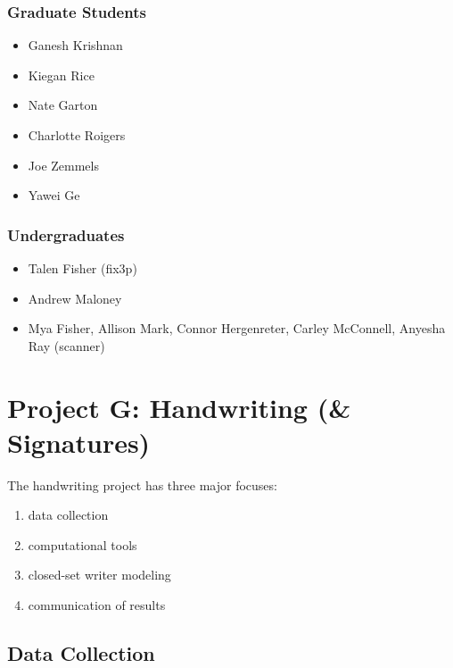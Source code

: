 \documentclass[]{book}
\providecommand{\tightlist}{%
  \setlength{\itemsep}{0pt}\setlength{\parskip}{0pt}}
\begin{document}
\hypertarget{graduate-students}{%
\subsection{Graduate Students}\label{graduate-students}}

\begin{itemize}
\tightlist
\item
  Ganesh Krishnan
\item
  Kiegan Rice
\item
  Nate Garton
\item
  Charlotte Roigers
\item
  Joe Zemmels
\item
  Yawei Ge
\end{itemize}

\hypertarget{undergraduates}{%
\subsection{Undergraduates}\label{undergraduates}}

\begin{itemize}
\tightlist
\item
  Talen Fisher (fix3p)
\item
  Andrew Maloney
\item
  Mya Fisher, Allison Mark, Connor Hergenreter, Carley McConnell, Anyesha Ray (scanner)
\end{itemize}

\hypertarget{project-g-handwriting-signatures}{%
\chapter{Project G: Handwriting (\& Signatures)}\label{project-g-handwriting-signatures}}

The handwriting project has three major focuses:

\begin{enumerate}
\def\labelenumi{\arabic{enumi}.}
\tightlist
\item
  data collection
\item
  computational tools
\item
  closed-set writer modeling
\item
  communication of results
\end{enumerate}

\hypertarget{data-collection-1}{%
\section{Data Collection}\label{data-collection-1}}
\end{document}
